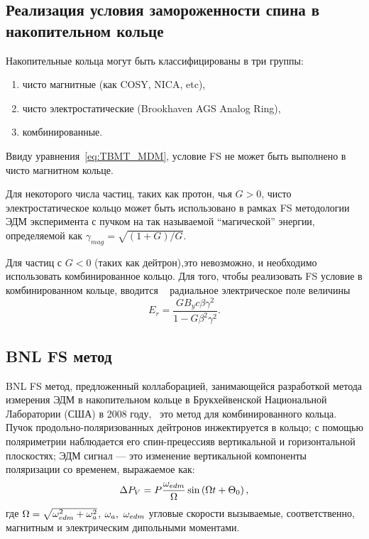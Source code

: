 \documentclass{report}
\begin{document}
\subsection{Реализация условия замороженности спина в накопительном кольце}
Накопительные кольца могут быть классифицированы в три группы:
\begin{enumerate}
\item чисто магнитные (как COSY, NICA, etc),
\item чисто электростатические (Brookhaven AGS Analog Ring),
\item комбинированные.
\end{enumerate}

Ввиду уравнения~\eqref{eq:TBMT_MDM}, условие FS не может быть
выполнено в чисто магнитном кольце.

Для некоторого числа частиц, таких как протон, чья $G>0$, чисто
электростатическое кольцо может быть использовано в рамках FS
методологии ЭДМ эксперимента с пучком на так называемой ``магической''
энергии, определяемой как $\gamma_{mag} = \sqrt{(1+G)/G}$.

Для частиц с $G<0$ (таких как дейтрон),это невозможно, и необходимо
использовать комбинированное кольцо. Для того, чтобы реализовать FS
условие в комбинированном кольце, вводится ~\cite{BNL:Deuteron2008} радиальное электрическое
поле величины
\begin{equation}\label{eq:FS_Er}
  E_r = \frac{GB_yc\beta\gamma^2}{1-G\beta^2\gamma^2}.
\end{equation}

\subsection{BNL FS метод}
BNL FS метод, предложенный коллаборацией, занимающейся разработкой
метода измерения ЭДМ в накопительном кольце в Брукхейвенской
Национальной Лаборатории (США) в 2008 году,~\cite{BNL:Deuteron2008}
это метод для комбинированного кольца. Пучок продольно-поляризованных
дейтронов инжектируется в кольцо; с помощью поляриметрии наблюдается
его спин-прецессияв вертикальной и горизонтальной плоскостях; ЭДМ
сигнал --- это изменение вертикальной компоненты поляризации со
временем, выражаемое как:~\citep[стр.~8]{BNL:Deuteron2008}
\begin{equation}
  \Delta P_V = P\frac{\w_{edm}}{\W}\sin\bkt{\W t + \Theta_0},
\end{equation}
где $\Omega = \sqrt{\omega_{edm}^2 + \omega_a^2}$, $\omega_a,~\omega_{edm}$ угловые
скорости вызываемые, соответственно, магнитным и электрическим
дипольными моментами.
\end{document}
